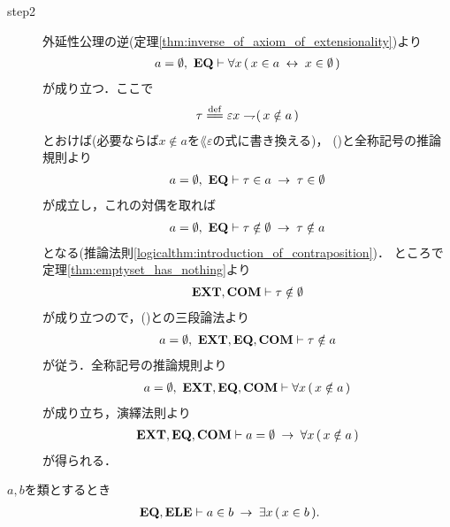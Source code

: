 \begin{prf}
\begin{description}
			\item[step2]
				外延性公理の逆(定理\ref{thm:inverse_of_axiom_of_extensionality})より
				\begin{align}
					a = \emptyset,\ \mbox{{\bf EQ}} \vdash
					\forall x\, (\, x \in a \hspace{0.25em}\leftrightarrow\hspace{0.25em} x \in \emptyset\, )
					\label{fom:uniqueness_of_emptyset_3}
				\end{align}
				が成り立つ．ここで
				\begin{align}
					\tau \defeq \varepsilon x \negation (\, x \notin a\, )
				\end{align}
				とおけば(必要ならば$x \notin a$を$\lang{\varepsilon}$の式に書き換える)，
				()と全称記号の推論規則より
				\begin{align}
					a = \emptyset,\ \mbox{{\bf EQ}} \vdash \tau \in a \hspace{0.25em}\rightarrow\hspace{0.25em} \tau \in \emptyset
				\end{align}
				が成立し，これの対偶を取れば
				\begin{align}
					a = \emptyset,\ \mbox{{\bf EQ}} \vdash 
					\tau \notin \emptyset \hspace{0.25em}\rightarrow\hspace{0.25em} \tau \notin a
					\label{fom:uniqueness_of_emptyset_4}
				\end{align}
				となる(推論法則\ref{logicalthm:introduction_of_contraposition})．
				ところで定理\ref{thm:emptyset_has_nothing}より
				\begin{align}
					\mbox{{\bf EXT}},\mbox{\bf COM} \vdash \tau \notin \emptyset
				\end{align}
				が成り立つので，()との三段論法より
				\begin{align}
					a = \emptyset,\ \mbox{{\bf EXT}},\mbox{{\bf EQ}},\mbox{\bf COM} \vdash \tau \notin a
				\end{align}
				が従う．全称記号の推論規則より
				\begin{align}
					a = \emptyset,\ \mbox{{\bf EXT}},\mbox{{\bf EQ}},\mbox{\bf COM} \vdash 
					\forall x\, (\, x \notin a\, )
				\end{align}
				が成り立ち，演繹法則より
				\begin{align}
					\mbox{{\bf EXT}},\mbox{{\bf EQ}},\mbox{\bf COM} \vdash 
					a = \emptyset \hspace{0.25em}\rightarrow\hspace{0.25em} \forall x\, (\, x \notin a\, )
				\end{align}
				が得られる．
				\QED
		\end{description}
	\end{prf}
	
	\begin{screen}
		\begin{thm}[類を要素として持てば空ではない]
		\label{thm:emptyset_does_not_contain_any_class}
			$a,b$を類とするとき
			\begin{align}
				\mbox{{\bf EQ}},\mbox{{\bf ELE}} \vdash a \in b \hspace{0.25em}\rightarrow\hspace{0.25em} \exists x\, (\, x \in b\, ).
			\end{align}
		\end{thm}
	\end{screen}
	
